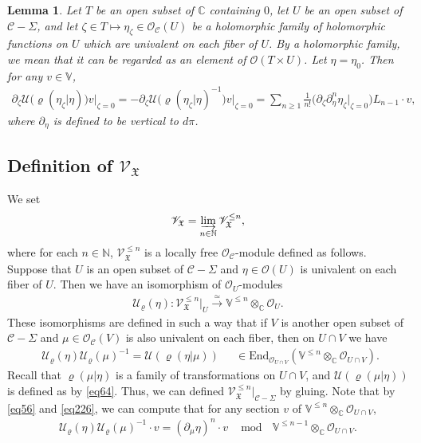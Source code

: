 \documentclass[12pt,a4paper,notitlepage]{report}
\theoremstyle{definition}
\theoremstyle{plain}
\newtheorem{lm}[df]{Lemma}
\newcommand{\fk}{\mathfrak}
\newcommand{\mc}{\mathcal}
\newcommand{\End}{\mathrm{End}} %
\newcommand{\scr}{\mathscr}
\newcommand{\Vbb}{\mathbb V}
\newcommand{\Cbb}{\mathbb C}
\newcommand{\Nbb}{\mathbb N}
\numberwithin{equation}{section}
\begin{document}
\begin{lm}\label{lb30}
Let $T$ be an open subset of $\Cbb$ containing $0$, let $U$ be an open subset of $\mc C-\Sigma$, and let $\zeta\in T\mapsto\eta_\zeta\in\scr O_{\mc C}(U)$ be a holomorphic family of holomorphic functions on $U$ which are univalent on each fiber of $U$. By a holomorphic family, we mean that it can be regarded as an element of $\scr O(T\times U)$. Let $\eta=\eta_0$. Then for any $v\in\Vbb$,
\begin{align}
\partial_\zeta\mc U\big(\varrho(\eta_\zeta|\eta)\big)v\Big|_{\zeta=0}=-\partial_\zeta\mc U\big(\varrho(\eta_\zeta|\eta)^{-1}\big)v\Big|_{\zeta=0}=\sum_{n\geq 1}\frac 1{n!}\Big(\partial_\zeta\partial_\eta^n\eta_\zeta\Big|_{\zeta=0}\Big)L_{n-1}\cdot v,
\end{align}
where $\partial_\eta$ is defined to be vertical to $d\pi$.
\end{lm}



\subsection*{Definition of $\scr V_{\fk X}$}


We set \index{VCVX@$\scr V_C,\scr V_C^{\leq n},\scr V_{\fk X},\scr V_{\fk X}^{\leq n}$} 
\begin{align}
\scr V_{\fk X}=\varinjlim_{n\in\Nbb}\scr V_{\fk X}^{\leq n},
\end{align}
where for each $n\in\Nbb$, $\scr V_{\fk X}^{\leq n}$ is a locally free $\scr O_{\mc C}$-module  defined as follows. Suppose that $U$ is an open subset of $\mc C-\Sigma$ and $\eta\in\scr O(U)$ is univalent on each fiber of $U$. Then we have an isomorphism of $\scr O_U$-modules \index{UV@$\mc U_\varrho(\eta),\mc U_\varrho(\varphi),\mc V_\varrho(\eta),\mc V_\varrho(\varphi)$}
\begin{align}
\mc U_\varrho(\eta):\scr V_{\fk X}^{\leq n}|_U\xrightarrow{\simeq} \Vbb^{\leq n}\otimes_{\Cbb}\scr O_U.
\end{align}
These isomorphisms are defined in such a way that if $V$ is another open subset of $\mc C-\Sigma$ and $\mu\in\scr O_{\mc C}(V)$ is also univalent on each fiber, then on $U\cap V$ we have
\begin{align}
\boxed{~~\mc U_\varrho(\eta)\mc U_\varrho(\mu)^{-1}=\mc U(\varrho(\eta|\mu))~~}\quad\in\End_{\scr O_{U\cap V}}(\Vbb^{\leq n}\otimes_{\Cbb}\scr O_{U\cap V}).\label{eq76}
\end{align}
Recall that $\varrho(\mu|\eta)$ is a family of transformations on $U\cap V$, and $\mc U(\varrho(\mu|\eta))$ is defined as by \eqref{eq64}. Thus, we can defined $\scr V_{\fk X}^{\leq n}|_{\mc C-\Sigma}$ by gluing. Note that by \eqref{eq56} and \eqref{eq226}, we can compute that for any section $v$ of $\Vbb^{\leq n}\otimes_{\Cbb}\scr O_{U\cap V}$,
\begin{align}
\mc U_\varrho(\eta)\mc U_\varrho(\mu)^{-1}\cdot v=(\partial_\mu\eta)^n\cdot v~~\mod ~~\Vbb^{\leq n-1}\otimes_{\Cbb}\scr O_{U\cap V}.\label{eq79}
\end{align}
\end{document}
